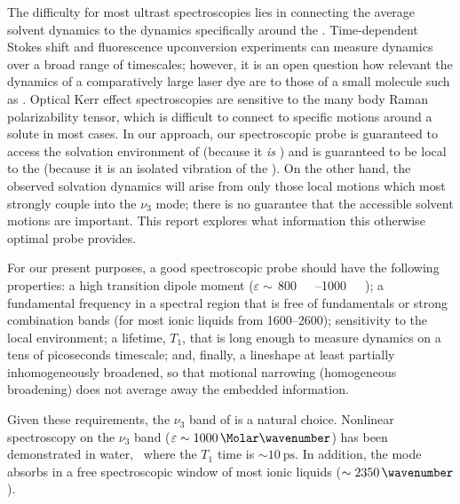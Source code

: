 \documentclass[%
  class = book,%
  crop = false,%
  float = true,%
  multi = true,%
  preview = false,%
]{standalone}
\begin{document}
The difficulty for most ultrast spectroscopies lies in connecting the average solvent dynamics to the dynamics specifically around the . Time-dependent Stokes shift and fluorescence upconversion experiments\cite{zhangJPCB-12} can measure dynamics over a broad range of timescales; however, it is an open question how relevant the dynamics of a comparatively large laser dye are to those of a small molecule such as . Optical Kerr effect spectroscopies\cite{turtonJACS-09,castnerACR-07} are sensitive to the many body Raman polarizability tensor, which is difficult to connect to specific motions around a solute in most cases. In our approach, our spectroscopic probe is guaranteed to access the solvation environment of  (because it \emph{is} ) and is guaranteed to be local to the  (because it is an isolated vibration of the ). On the other hand, the observed solvation dynamics will arise from only those local motions which most strongly couple into the \(\nu_3\) mode; there is no guarantee that the accessible solvent motions are important. This report explores what information this otherwise optimal probe provides.

For our present purposes, a good spectroscopic probe should have the following properties: a high transition dipole moment (\(\varepsilon \sim\,\)\SIrange{800}{1000}{\per\Molar\wavenumber}); a fundamental frequency in a spectral region that is free of fundamentals or strong combination bands (for most ionic liquids from \SIrange{1600}{2600}{\wavenumber}); sensitivity to the local environment; a lifetime, \(T_1\), that is long enough to measure dynamics on a tens of picoseconds timescale; and, finally, a lineshape at least partially inhomogeneously broadened, so that motional narrowing (homogeneous broadening) does not average away the embedded information.

Given these requirements, the \(\nu_3\) band of  is a natural choice. Nonlinear spectroscopy on the \(\nu_3\) band (\(\varepsilon \sim \SI{1000}{\per\Molar\wavenumber}\)) has been demonstrated in water,~\cite{Hamm1998,Garrett-Roe2009a} where the \(T_1\) time is \(\sim \SI{10}{\ps}\). In addition, the mode absorbs in a free spectroscopic window of most ionic liquids (\(\sim \SI{2350}{\wavenumber}\)).
\end{document}
